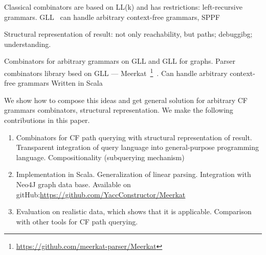 Classical combinators are based on LL(k) and has restrictions: left-recursive grammars.
GLL~\cite{scott2010gll} can handle arbitrary context-free grammars, SPPF~\cite{SPPF}


Structural representation of result: not only reachability, but paths; debuggibg; understanding.


Combinators for arbitrary grammars on GLL and GLL for graphs. 
Parser combinators library bsed on GLL --- 
Meerkat~\footnote{\url{https://github.com/meerkat-parser/Meerkat}}~\cite{Meerkat}. 
Can handle arbitrary context-free grammars
Written in Scala


We show how to compose this ideas and get general solution for arbitrary CF grammars combinators, structural representation.
We make the following contributions in this paper.
\begin{enumerate}
\item Combinators for CF path querying with structural representation of result.
 Transparent integration of query language into general-purpose programming language. Compositionality (subquerying mechanism)
\item Implementation in Scala. Generalization of linear parsing. Integration with Neo4J graph data base. Available on gitHub:\url{https://github.com/YaccConstructor/Meerkat}
\item Evaluation on realistic data, which shows that it is applicable. Comparison  with other tools 
for CF path querying.
\end{enumerate}